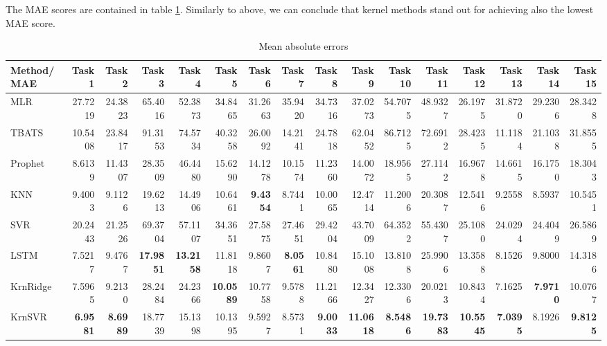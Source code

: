 The MAE scores are contained in table \ref{tab:point_MAE}. Similarly to above, we can conclude that kernel methods stand out for achieving also the lowest MAE score.
\begin{table}[!ht]
    \caption{Mean absolute errors}
    \label{tab:point_MAE}
    \begin{adjustbox}{width=\textwidth}
        \begin{tabular}{lrrrrrrrrrrrrrrr}
            \toprule
             Method/MAE & Task 1 & Task 2 & Task 3 & Task 4 & Task 5 & Task 6 & Task 7 & Task 8 & Task 9 & Task 10 & Task 11 & Task 12 & Task 13 & Task 14 & Task 15 \\
            \midrule
            MLR & 27.7219 & 24.3823 & 65.4016 & 52.3873 & 34.8465 & 31.2663 & 35.9420 & 34.7316 & 37.0273 & 54.7075 & 48.9327 & 26.1975 & 31.8720 & 29.2306 & 28.3428 \\
            TBATS & 10.5408 & 23.8417 & 91.3153 & 74.5734 & 40.3258 & 26.0092 & 14.2141 & 24.7818 & 62.0452 & 86.7125 & 72.6912 & 28.4235 & 11.1184 & 21.1038 & 31.8555 \\
            Prophet & 8.6139 & 11.4307 & 28.3509 & 46.4480 & 15.6290 & 14.1278 & 10.1574 & 11.2360 & 14.0072 & 18.9565 & 27.1142 & 16.9678 & 14.6615 & 16.1750 & 18.3043 \\
            KNN & 9.4003 & 9.1126 & 19.6213 & 14.4906 & 10.6461 & \textbf{9.4354} & 8.7441 & 10.0065 & 12.4714 & 11.2006 & 20.3087 & 12.5416 & 9.2558 & 8.5937 & 10.5451 \\
            SVR & 20.2443 & 21.2526 & 69.3704 & 57.1107 & 34.3651 & 27.5875 & 27.4651 & 29.4204 & 43.7009 & 64.3522 & 55.4307 & 25.1080 & 24.0294 & 24.4049 & 26.5869 \\
            LSTM & 7.5217 & 9.4767 & \textbf{17.9851} & \textbf{13.2158} & 11.8118 & 9.8607 & \textbf{8.0561} & 10.8480 & 15.1008 & 13.8108 & 25.9906 & 13.3588 & 8.1526 & 9.8000 & 14.3186 \\
            KrnRidge & 7.5965 & 9.2130 & 28.2484 & 24.2366 & \textbf{10.0589} & 10.7758 & 9.5788 & 11.2166 & 12.3427 & 12.3306 & 20.0213 & 10.8434 & 7.1625 & \textbf{7.9710} & 10.0767 \\
            KrnSVR & \textbf{6.9581} & \textbf{8.6989} & 18.7739 & 15.1398 & 10.1395 & 9.5927 & 8.5731 & \textbf{9.0033} & \textbf{11.0618} & \textbf{8.5486} & \textbf{19.7383} & \textbf{10.5545} & \textbf{7.0395} & 8.1926 & \textbf{9.8125} \\
            \bottomrule
            \end{tabular}            
    \end{adjustbox}            
\end{table}

